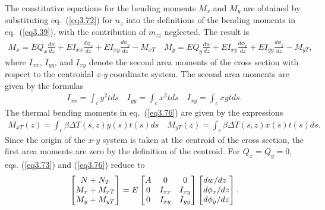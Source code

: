 \documentclass{AeroStructure-ERJohnson}
\begin{document}
The constitutive equations for the bending moments $M_{x}$ and $M_{y}$ are obtained by substituting eq.~(\ref{eq3.72}) for $n_z$ into the definitions of the bending moments in eq.~(\ref{eq3.39}), with the contribution of $m_{zz}$ neglected. The result is
\begin{align}\label{eq3.76}
M_{x}=E Q_{x} \frac{d w}{d z}+E I_{x x} \frac{d \phi_{x}}{d z}+E I_{x y} \frac{d \phi_{y}}{d z}-M_{x T} \quad M_{y}=E Q_{y} \frac{d w}{d z}+E I_{x y} \frac{d \phi_{x}}{d z}+E I_{y y} \frac{d \phi_{y}}{d z}-M_{y T},
\end{align}
where $I_{xx}$, $I_{yy}$, and $I_{xy}$ denote the second area moments of the cross section with respect to the centroidal \textit{x-y} coordinate system. The second area moments are given by the formulas
\begin{align}\label{eq3.77}
I_{x x}=\int_{c} y^{2} t d s \quad I_{y y}=\int_{c} x^{2} t d s \quad I_{x y}=\int_{c} x y t d s.
\end{align}
The thermal bending moments in eq.~(\ref{eq3.76}) are given by the expressions
\begin{align}\label{eq3.78}
M_{x T}(z)=\int_{c} \beta \Delta T(s, z) y(s) t(s) d s \quad M_{y T}(z)=\int_{c} \beta \Delta T(s, z) x(s) t(s) d s.
\end{align}
Since the origin of the $x$-$y$ system is taken at the centroid of the cross section, the first area moments are zero by the definition of the centroid. For $Q_{x}=Q_{y}=0$, eqs. (\ref{eq3.73}) and (\ref{eq3.76}) reduce to
\begin{align}\label{eq3.79}
\left[\begin{array}{@{}c@{}}N+N_{T} \\M_{x}+M_{x T} \\M_{y}+M_{y T}\end{array}\right]=E\left[\begin{array}{@{}ccc@{}}A & 0 & 0 \\0 & I_{x x} & I_{x y} \\0 & I_{x y} & I_{y y}\end{array}\right]\left[\begin{array}{@{}l@{}}d w / d z \\d \phi_{x} / d z \\d \phi_{y} / d z\end{array}\right].
\end{align}

\vspace*{-1.2pc}
\end{document}
